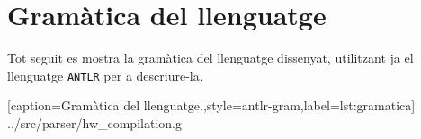 
\section{Gramàtica del llenguatge}

Tot seguit es mostra la gramàtica del llenguatge dissenyat, utilitzant ja el 
llenguatge \texttt{ANTLR} per a descriure-la.

%
  [caption={Gramàtica del llenguatge.},style=antlr-gram,label={lst:gramatica}]%
  {../src/parser/hw_compilation.g}

